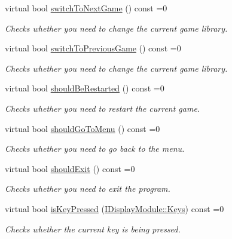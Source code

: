 \begin{DoxyCompactItemize}
virtual bool \mbox{\hyperlink{classArcade_1_1Display_1_1IDisplayModule_a9584cb0ca3b157c9a4ec94509e4f8e32}{switch\+To\+Next\+Game}} () const =0
\begin{DoxyCompactList}\small\item\em Checks whether you need to change the current game library. \end{DoxyCompactList}\item 
virtual bool \mbox{\hyperlink{classArcade_1_1Display_1_1IDisplayModule_a3bbbfe00907c8f3e4c7ef1aadedcc513}{switch\+To\+Previous\+Game}} () const =0
\begin{DoxyCompactList}\small\item\em Checks whether you need to change the current game library. \end{DoxyCompactList}\item 
virtual bool \mbox{\hyperlink{classArcade_1_1Display_1_1IDisplayModule_adc5d499229aa5899bbd4bae14f00cb27}{should\+Be\+Restarted}} () const =0
\begin{DoxyCompactList}\small\item\em Checks whether you need to restart the current game. \end{DoxyCompactList}\item 
virtual bool \mbox{\hyperlink{classArcade_1_1Display_1_1IDisplayModule_ad060f6b99f2adffaf02a4226fc40d0ab}{should\+Go\+To\+Menu}} () const =0
\begin{DoxyCompactList}\small\item\em Checks whether you need to go back to the menu. \end{DoxyCompactList}\item 
virtual bool \mbox{\hyperlink{classArcade_1_1Display_1_1IDisplayModule_a550877fb92d58325404b9ebe9e71f6ff}{should\+Exit}} () const =0
\begin{DoxyCompactList}\small\item\em Checks whether you need to exit the program. \end{DoxyCompactList}\item 
virtual bool \mbox{\hyperlink{classArcade_1_1Display_1_1IDisplayModule_ab3d02b76c08ff2deb728dc9f0d557f43}{is\+Key\+Pressed}} (\mbox{\hyperlink{classArcade_1_1Display_1_1IDisplayModule_a8da3f6b309ca0581473ae8cc8789b619}{I\+Display\+Module\+::\+Keys}}) const =0
\begin{DoxyCompactList}\small\item\em Checks whether the current key is being pressed. \end{DoxyCompactList}\item 

\end{DoxyCompactItemize}
